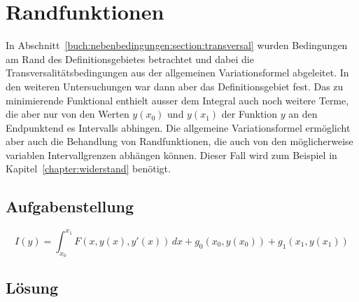 %
%
%
\section{Randfunktionen
\label{buch:nebenbedingungen:section:randfunktionen}}
In Abschnitt~\ref{buch:nebenbedingungen:section:transversal} wurden
Bedingungen am Rand des Definitionsgebietes betrachtet und dabei
die Transversalitätsbedingungen aus der allgemeinen Variationsformel
abgeleitet.
In den weiteren Untersuchungen war dann aber das Definitionsgebiet
fest.
Das zu minimierende Funktional enthielt ausser dem Integral auch
noch weitere Terme, die aber nur von den Werten $y(x_0)$ und
$y(x_1)$ der Funktion $y$ an den Endpunktend es Intervalls
abhingen.
Die allgemeine Variationsformel ermöglicht aber auch die Behandlung
von Randfunktionen, die auch von den möglicherweise variablen
Intervallgrenzen abhängen können.
Dieser Fall wird zum Beispiel in Kapitel~\ref{chapter:widerstand}
benötigt.

%
%
\subsection{Aufgabenstellung
\label{buch:nebenbedingungen:randfunktionen:subsection:aufgabenstellung}}

\begin{equation}
I(y)
=
\int_{x_0}^{x_1}
F(x,y(x),y'(x))
\,dx
+
g_0(x_0,y(x_0))
+
g_1(x_1,y(x_1))
\label{buch:nebenbedingungen:randfunktionen:eqn:funktional}
\end{equation}

%
%
\subsection{Lösung
\label{buch:nebenbedingungen:randfunktionen:subsection:loesung}}


